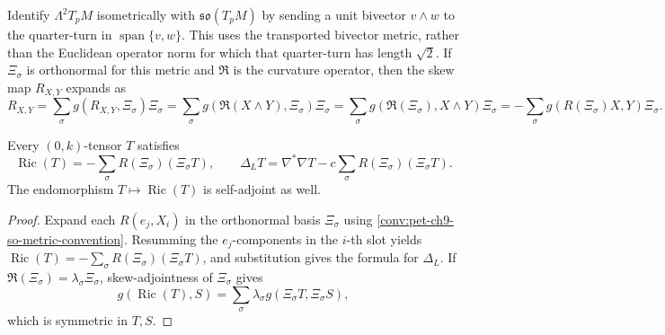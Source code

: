 \begin{convention}
  \label{conv:pet-ch9-so-metric-convention}

  Identify $\Lambda^2T_pM$ isometrically with $\mathfrak{so}(T_pM)$ by sending
  a unit bivector $v\wedge w$ to the quarter-turn in
  $\operatorname{span}\{v,w\}$.  This uses the transported bivector metric,
  rather than the Euclidean operator norm for which that quarter-turn has
  length $\sqrt2$.  If $\Xi_\sigma$ is orthonormal for this metric and
  $\mathfrak R$ is the curvature operator, then the skew map
  $R_{X,Y}$ expands as
  \[
    R_{X,Y}=\sum_\sigma g(R_{X,Y},\Xi_\sigma)\Xi_\sigma
    =\sum_\sigma g(\mathfrak{R}(X\wedge Y),\Xi_\sigma)\Xi_\sigma
    =\sum_\sigma g(\mathfrak{R}(\Xi_\sigma),X\wedge Y)\Xi_\sigma
    =-\sum_\sigma g(R(\Xi_\sigma)X,Y)\Xi_\sigma.
  \]
\end{convention}

\begin{lemma}
  \label{lem:pet-ch9-ric-curvature-operator-formula}

  Every $(0,k)$-tensor $T$ satisfies
  \[
    \operatorname{Ric}(T)=-\sum_\sigma R(\Xi_\sigma)(\Xi_\sigma T),\qquad
    \Delta_LT=\nabla^*\nabla T-c\sum_\sigma R(\Xi_\sigma)(\Xi_\sigma T).
  \]
  The endomorphism $T\mapsto\operatorname{Ric}(T)$ is self-adjoint as well.
\end{lemma}
\begin{proof}
  \sketch
  Expand each \(R(e_j,X_i)\) in the orthonormal basis
  \(\Xi_\sigma\) using \cref{conv:pet-ch9-so-metric-convention}.  Resumming
  the \(e_j\)-components in the \(i\)-th slot yields
  \(\operatorname{Ric}(T)=-\sum_\sigma R(\Xi_\sigma)(\Xi_\sigma T)\), and
  substitution gives the formula for \(\Delta_L\).  If
  \(\mathfrak R(\Xi_\sigma)=\lambda_\sigma\Xi_\sigma\), skew-adjointness of
  \(\Xi_\sigma\) gives
  \[
    g(\operatorname{Ric}(T),S)
      =\sum_\sigma\lambda_\sigma g(\Xi_\sigma T,\Xi_\sigma S),
  \]
  which is symmetric in \(T,S\).
\end{proof}

